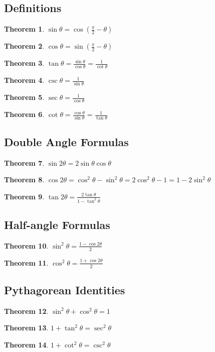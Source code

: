 \documentclass[10pt]{report}
\newtheorem{thm3}{Theorem}[subsection]
\begin{document}
\subsection{Definitions}
\begin{thm3}$\sin\theta = \cos(\frac{\pi}{2} - \theta)$\end{thm3}
\begin{thm3}$\cos\theta = \sin (\frac{\pi}{2} - \theta)$\end{thm3}
\begin{thm3}$\tan \theta = \frac{\sin\theta}{\cos \theta} = \frac{1}{\cot \theta}$ \end{thm3}
\begin{thm3}$\csc\theta = \frac{1}{\sin\theta}$\end{thm3}
\begin{thm3}$\sec\theta = \frac{1}{\cos\theta}$\end{thm3}
\begin{thm3}$\cot\theta = \frac{\cos\theta}{\sin \theta} = \frac{1}{\tan\theta}$ \end{thm3}
\subsection{Double Angle Formulas}
\begin{thm3}$\sin2\theta = 2\sin\theta\cos\theta$\end{thm3}
\begin{thm3}$\cos2\theta =\cos^{2}\theta - \sin^{2}\theta = 2\cos^{2}\theta - 1 = 1 - 2\sin^{2}\theta$\end{thm3}
\begin{thm3}$\tan2\theta = \frac{2\tan\theta}{1 - \tan^{2}\theta}$\end{thm3}
\subsection{Half-angle Formulas}
\begin{thm3}$\sin^{2}\theta = \frac{1 - \cos2\theta}{2}$\end{thm3}
\begin{thm3}$\cos^{2}\theta = \frac{1 + \cos2\theta}{2}$\end{thm3}
\subsection{Pythagorean Identities}
\begin{thm3}$\sin^{2}\theta + \cos^{2}\theta=1$\end{thm3}
\begin{thm3}$1 + \tan^{2}\theta = \sec^{2}\theta$\end{thm3}
\begin{thm3}$1 + \cot^{2}\theta = \csc^{2}\theta$\end{thm3}
\end{document}
